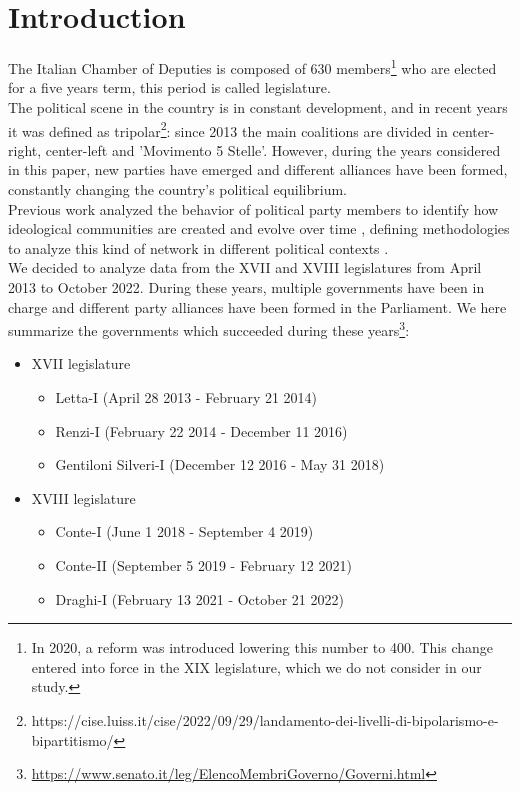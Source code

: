 \section{Introduction}

The Italian Chamber of Deputies is composed of 630 members\footnote{In 2020, a reform was introduced lowering this number to 400. This change entered into force in the XIX legislature, which we do not consider in our study.} who are elected for a five years term, this period is called legislature.\\
The political scene in the country is in constant development, and in recent years it was defined as tripolar\footnote{https://cise.luiss.it/cise/2022/09/29/landamento-dei-livelli-di-bipolarismo-e-bipartitismo/}: since 2013 the main coalitions are divided in center-right, center-left and 'Movimento 5 Stelle'.
However, during the years considered in this paper, new parties have emerged and different alliances have been formed, constantly changing the country's political equilibrium.\\

Previous work analyzed the behavior of political party members to identify how ideological communities are created and evolve over time \cite{AnIdeoComm} \cite{10.1371/journal.pone.0116046}, defining methodologies to analyze this kind of network in different political contexts .\\We decided to analyze data from the XVII and XVIII legislatures from April 2013 to October 2022. During these years, multiple governments have been in charge and different party alliances have been formed in the Parliament. We here summarize the governments which succeeded during these years\footnote{\url{https://www.senato.it/leg/ElencoMembriGoverno/Governi.html}}:

\begin{itemize}
\item XVII legislature
\begin{itemize}
    \item Letta-I (April 28 2013 - February 21 2014) 
    \item Renzi-I (February 22 2014 - December 11 2016)  
    \item Gentiloni Silveri-I (December 12 2016 - May 31 2018) 
\end{itemize}
\item XVIII legislature
\begin{itemize}
    \item Conte-I (June 1 2018 - September 4 2019) 
    \item Conte-II (September 5 2019 - February 12 2021) 
    \item Draghi-I (February 13 2021 - October 21 2022) 
\end{itemize}
\end{itemize}


